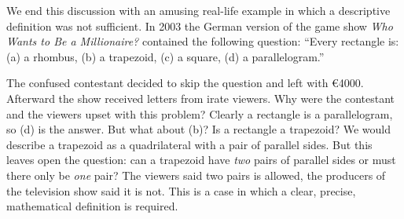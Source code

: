 We end this discussion with an amusing real-life example in which a descriptive definition was not sufficient. In 2003 the German version of the game show \emph{Who Wants to Be a Millionaire?} contained the following question: ``Every rectangle is: (a) a rhombus, (b) a trapezoid, (c) a square, (d) a parallelogram.'' 

The confused contestant decided to skip the question and left with \euro 4000. Afterward the show received letters from irate viewers. Why were the contestant and the viewers upset with this problem? Clearly a rectangle is a parallelogram, so (d) is the answer. But what about (b)? Is a rectangle a trapezoid? We would describe a trapezoid as a quadrilateral with a pair of parallel sides. But this leaves open the question: can a trapezoid have \emph{two} pairs of parallel sides or must there only be \emph{one} pair? The viewers said two pairs is allowed, the producers of the television show said it is not. This is a case in which a clear, precise, mathematical definition is required.